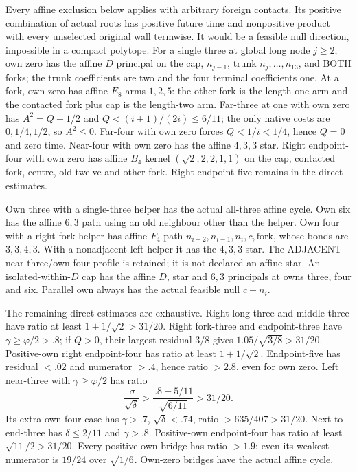 \documentclass[11pt]{article}
\begin{document}
Every affine exclusion below applies with arbitrary foreign
contacts.  Its positive combination of actual roots has
positive future time and nonpositive product with every
unselected original wall termwise.
It would be a feasible null direction, impossible in a
compact polytope.
For a single three at global long node \(j\ge2\), own zero
has the affine \(D\) principal on the cap, \(n_{j-1}\),
trunk \(n_j,\ldots,n_{13}\), and BOTH forks;
the trunk coefficients are two and the four terminal
coefficients one.
At a fork, own zero has affine \(E_8\) arms \(1,2,5\):
the other fork is the length-one arm and the contacted fork
plus cap is the length-two arm.
Far-three at one with own zero has
\(A^2=Q-1/2\) and \(Q<(i+1)/(2i)\le6/11\);
the only native costs are \(0,1/4,1/2\), so \(A^2\le0\).
Far-four with own zero forces \(Q<1/i<1/4\),
hence \(Q=0\) and zero time.
Near-four with own zero has the affine \(4,3,3\) star.
Right endpoint-four with own zero has affine \(B_4\)
kernel \((\sqrt2,2,2,1,1)\) on the cap, contacted fork,
centre, old twelve and other fork.
Right endpoint-five remains in the direct estimates.

Own three with a single-three helper has the actual
all-three affine cycle.
Own six has the affine \(6,3\) path using an old neighbour
other than the helper.
Own four with a right fork helper has affine \(F_4\)
path \(n_{i-2},n_{i-1},n_i,c,\text{fork}\),
whose bonds are \(3,3,4,3\).
With a nonadjacent left helper it has the \(4,3,3\) star.
The ADJACENT near-three/own-four profile is retained;
it is not declared an affine star.
An isolated-within-\(D\) cap has the affine \(D\),
star and \(6,3\) principals at owns three, four and six.
Parallel own always has the actual feasible null \(c+n_i\).

The remaining direct estimates are exhaustive.
Right long-three and middle-three have ratio at least
\(1+1/\sqrt2>31/20\).
Right fork-three and endpoint-three have
\(\gamma\ge\varphi/2>.8\); if \(Q>0\), their largest
residual \(3/8\) gives
\(1.05/\sqrt{3/8}>31/20\).
Positive-own right endpoint-four has ratio at least
\(1+1/\sqrt2\).
Endpoint-five has residual \(<.02\) and numerator \(>.4\),
hence ratio \(>2.8\), even for own zero.
Left near-three with \(\gamma\ge\varphi/2\) has ratio
\[
 {\frac{\,\sigma}{\sqrt\delta}}>
 {\frac{\, .8+5/11}{\sqrt{6/11}}}>31/20 .
\]
Its extra own-four case has \(\gamma>.7\),
\(\sqrt\delta<.74\), ratio \(>635/407>31/20\).
Next-to-end-three has \(\delta\le2/11\) and \(\gamma>.8\).
Positive-own endpoint-four has ratio at least
\(\sqrt{11}/2>31/20\).
Every positive-own bridge has ratio \(>1.9\):
even its weakest numerator is \(19/24\) over \(\sqrt{1/6}\).
Own-zero bridges have the actual affine cycle.
\end{document}
